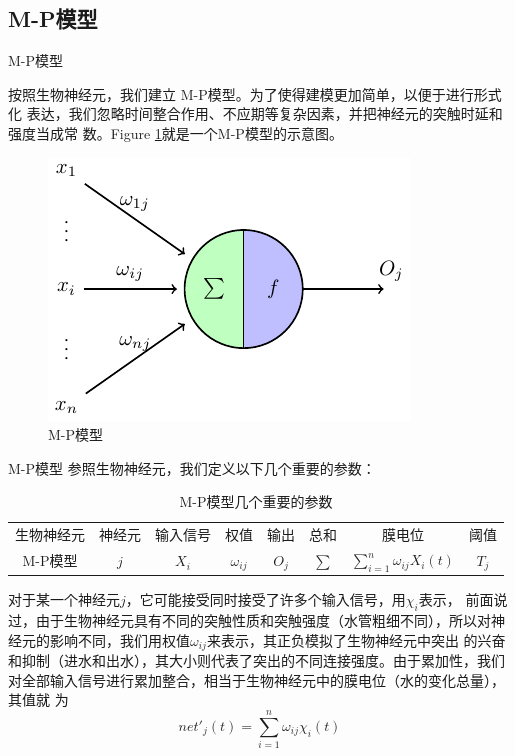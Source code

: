 \documentclass[xcolor=svgnames]{beamer}
\begin{document}
\subsection{M-P模型}

\begin{frame}{M-P模型}
  \setlength\parindent{2em}
  
  按照生物神经元，我们建立 \alert{M-P模型}。为了使得建模更加简单，以便于进行形式化
  表达，我们忽略时间整合作用、不应期等复杂因素，并把神经元的突触时延和强度当成常
  数。Figure \ref{fig:m-p}就是一个M-P模型的示意图。

  \begin{figure}
    \centering
    \includegraphics[width=.5\textwidth]{fig41.pdf}
    \caption{M-P模型}
    \label{fig:m-p}
  \end{figure}
  
\end{frame}

\begin{frame}{M-P模型}
  参照生物神经元，我们定义以下几个重要的参数：
  \vspace{-1em}
  \begin{table}
    \begin{center}
      \small
      \caption{M-P模型几个重要的参数}
      \vspace{-1em}      
      \label{tab:bvsmp}
      \begin{tabular}{cccccccc}
        \hline
        生物神经元 & 神经元 & 输入信号 & 权值 & 输出 & 总和 & 膜电位 & 阈值\\
        M-P模型   & $j$ & $X_i$ & $\omega_{ij}$ & $O_j$ & $\sum$ &
        $\sum_{i=1}^n\omega_{ij}X_i(t)$ & $T_j$\\
        \hline
      \end{tabular}
    \end{center}
    \flushleft
    
    对于某一个神经元\(j\)，它可能接受同时接受了许多个输入信号，用\(\chi_{i}\)表示，
    前面说过，由于生物神经元具有不同的突触性质和突触强度（水管粗细不同），所以对神
    经元的影响不同，我们用权值\(\omega_{ij}\)来表示，其正负模拟了生物神经元中突出
    的兴奋和抑制（进水和出水），其大小则代表了突出的不同连接强度。由于累加性，我们
    对全部输入信号进行累加整合，相当于生物神经元中的膜电位（水的变化总量），其值就
    为
    \begin{equation}
      \label{eq:net}
      net'_j(t)=\sum_{i=1}^n\omega_{ij}\chi_{i}(t)    
    \end{equation}

  \end{table}
\end{frame}
\end{document}

